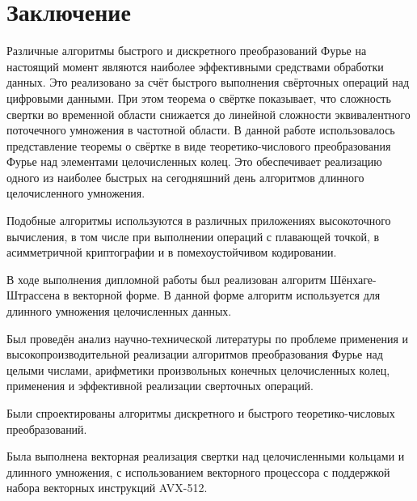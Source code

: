 \chapter*{Заключение}
Различные алгоритмы быстрого и дискретного преобразований Фурье на настоящий момент являются наиболее эффективными средствами обработки данных.
Это реализовано за счёт быстрого выполнения свёрточных операций над цифровыми данными.
При этом теорема о свёртке показывает, что сложность свертки во временной области снижается до линейной сложности эквивалентного поточечного умножения в частотной области.
В данной работе использовалось представление теоремы о свёртке в виде теоретико-числового преобразования Фурье над элементами целочисленных колец.
Это обеспечивает реализацию одного из наиболее быстрых на сегодняшний день алгоритмов длинного целочисленного умножения.

Подобные алгоритмы используются в различных приложениях высокоточного вычисления, в том числе при выполнении операций с плавающей точкой, в асимметричной криптографии и в помехоустойчивом кодировании.

В ходе выполнения дипломной работы был реализован алгоритм Шёнхаге-Штрассена в векторной форме.
В данной форме алгоритм используется для длинного умножения целочисленных данных.

Был проведён анализ научно-технической литературы по проблеме применения и высокопроизводительной реализации алгоритмов преобразования Фурье над целыми числами, арифметики произвольных конечных целочисленных колец, применения и эффективной реализации сверточных операций.

Были спроектированы алгоритмы дискретного и быстрого теоретико-числовых преобразований.

Была выполнена векторная реализация свертки над целочисленными кольцами и длинного умножения, с использованием векторного процессора с поддержкой набора векторных инструкций AVX-512.

